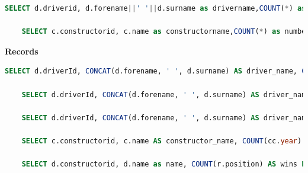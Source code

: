 \documentclass{article}
\begin{document}
\begin{enumerate}
\begin{lstlisting}[language=SQL]
    SELECT d.driverid, d.forename||' '||d.surname as drivername,COUNT(*) as number_of_wins FROM results r JOIN races ra ON r.raceId = ra.raceId JOIN circuits ci ON ra.circuitId = ci.circuitId JOIN drivers d ON r.driverId = d.driverId WHERE ci.circuitid = $1 AND r.position = 1 GROUP BY d.driverId, drivername ORDER BY number_of_wins DESC, drivername LIMIT 5;

    SELECT c.constructorid, c.name as constructorname,COUNT(*) as number_of_wins FROM results r JOIN races ra ON r.raceId = ra.raceId JOIN circuits ci ON ra.circuitId = ci.circuitId JOIN constructors c ON r.constructorId = c.constructorId WHERE ci.circuitid = $1 AND r.position = 1 GROUP BY c.constructorId, constructorname ORDER BY number_of_wins DESC, constructorname LIMIT 5;
\end{lstlisting}\vspace{6mm}


\textbf{Records}\\

\begin{lstlisting}[language=SQL]
    SELECT d.driverId, CONCAT(d.forename, ' ', d.surname) AS driver_name, COUNT(c.year) as championship_count FROM champions c JOIN drivers d ON c.driverId = d.driverId GROUP BY d.driverId, driver_name ORDER BY championship_count DESC LIMIT 5;

    SELECT d.driverId, CONCAT(d.forename, ' ', d.surname) AS driver_name, COUNT(r.position) AS wins FROM drivers d JOIN results r ON d.driverId = r.driverId WHERE r.position = 1 GROUP BY d.driverId, driver_name HAVING COUNT(r.position) >= 1 ORDER BY wins DESC LIMIT 5;

    SELECT d.driverId, CONCAT(d.forename, ' ', d.surname) AS driver_name, COUNT(r.grid) AS pole_positions_count FROM drivers d JOIN results r ON d.driverId = r.driverId WHERE r.grid = 1 GROUP BY d.driverId HAVING COUNT(r.grid) >= 1 ORDER BY pole_positions_count DESC LIMIT 5;

    SELECT c.constructorid, c.name AS constructor_name, COUNT(cc.year) AS championship_count FROM constructor_champions cc JOIN constructors c ON cc.constructorid = c.constructorid GROUP BY c.name,c.constructorid ORDER BY championship_count DESC LIMIT 5;

    SELECT d.constructorid, d.name as name, COUNT(r.position) AS wins FROM constructors d JOIN results r ON d.constructorId = r.constructorId WHERE r.position = 1 GROUP BY d.constructorId, name HAVING COUNT(r.position) >= 1 ORDER BY wins DESC LIMIT 5;


\end{lstlisting}
\end{enumerate}
\end{document}
